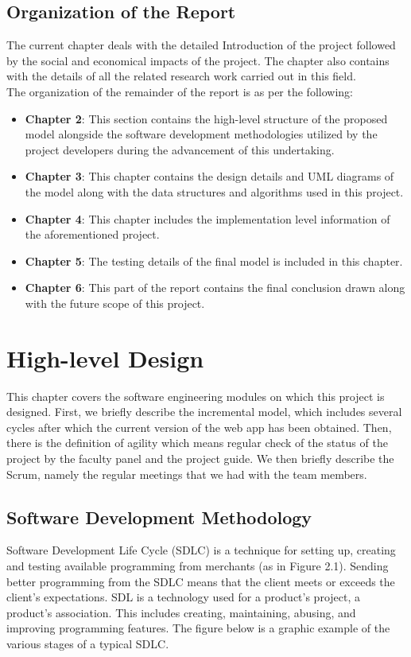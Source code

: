 \documentclass[oneside,12pt]{Classes/VTU}
\begin{document}
   	\section{Organization of the Report}
  	 The current chapter deals with the detailed Introduction of the project followed by the social and economical impacts of the project. The chapter also contains with the details of all the related research work carried out in this field.
  	 \\
  	 The organization of the remainder of the report is as per the following:
  	 \begin{itemize}
  	 	\item \textbf{Chapter 2}: This section contains the high-level structure of the proposed model alongside the software development methodologies utilized by the project developers during the advancement of this undertaking.
  	 	\item \textbf{Chapter 3}: This chapter contains the design details and UML diagrams of the model along with the data structures and algorithms used in this project.
  	 	\item \textbf{Chapter 4}: This chapter includes the implementation level information of the aforementioned project.
  	 	\item \textbf{Chapter 5}: The testing details of the final model is included in this chapter.
  	 	\item \textbf{Chapter 6}: This part of the report contains the final conclusion drawn along with the future scope of this project.
  	 \end{itemize}
    
    \chapter{High-level Design}
    
   	This chapter covers the software engineering modules on which this project is designed. First, we briefly describe the incremental model, which includes several cycles after which the current version of the web app has been obtained. Then, there is the definition of agility which means regular check of the status of the project by the faculty panel and the project guide. We then briefly describe the Scrum, namely the regular meetings that we had with the team members.
    \section{Software Development Methodology}
    	Software Development Life Cycle (SDLC) is a technique for setting up, creating and testing available programming from merchants (as in Figure 2.1). Sending better programming from the SDLC means that the client meets or exceeds the client's expectations. SDL is a technology used for a product's project, a product's association. This includes creating, maintaining, abusing, and improving programming features. The figure below is a graphic example of the various stages of a typical SDLC.
    	
\end{document}
